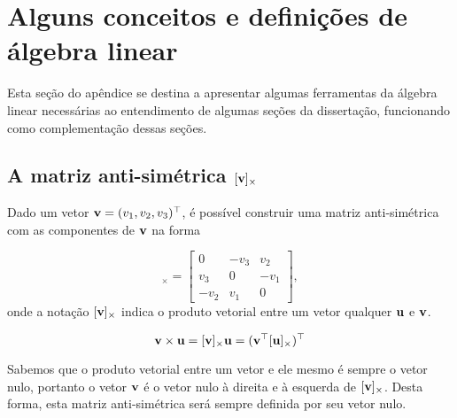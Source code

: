 \section{Alguns conceitos e definições de álgebra linear}\label{sec.Apen-A}
Esta seção do apêndice se destina a apresentar algumas ferramentas da álgebra linear necessárias ao entendimento de algumas seções da dissertação, funcionando como complementação dessas seções.

\subsection*{A matriz anti-simétrica $[{\bf v}]_\times$}
Dado um vetor ${\bf v}=(v_1,v_2,v_3)^\top$, é possível construir uma matriz anti-simétrica com as componentes de ${\bf v}$ na forma

\begin{equation*}
[{\bf v}]_\times=
\begin{bmatrix}
0&-v_3&v_2\\
v_3&0&-v_1\\
-v_2&v_1&0
\end{bmatrix},
\end{equation*}
onde a notação $[{\bf v}]_\times$ indica o produto vetorial entre um vetor qualquer ${\bf u}$ e ${\bf v}$. 

\begin{equation*}
{\bf v} \times {\bf u} = [{\bf v}]_\times {\bf u} = ({\bf v}^\top [{\bf u}]_\times)^\top
\end{equation*}

Sabemos que o produto vetorial entre um vetor e ele mesmo é sempre o vetor nulo, portanto o vetor ${\bf v}$ é o vetor nulo à direita e à esquerda de $[{\bf v}]_\times$. Desta forma, esta matriz anti-simétrica será sempre definida por seu vetor nulo.  

